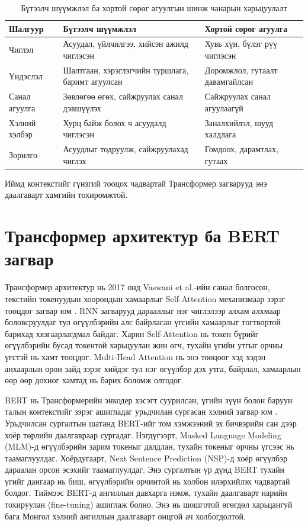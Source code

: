 \begin{table}[ht]
  \centering
  \small
  \caption{Бүтээлч шүүмжлэл ба хортой сөрөг агуулгын шинж чанарын харьцуулалт}
  \label{tab:constructive-vs-toxic}
  \begin{tabular}{@{}lp{4.6cm}p{4.6cm}@{}}
    \toprule
    \textbf{Шалгуур} & \textbf{Бүтээлч шүүмжлэл} & \textbf{Хортой сөрөг агуулга} \\
    \midrule
    Чиглэл        & Асуудал, үйлчилгээ, хийсэн ажилд чиглэсэн & Хувь хүн, бүлэг рүү чиглэсэн \\[2pt]
    Үндэслэл      & Шалтгаан, хэрэглэгчийн туршлага, баримт агуулсан      & Доромжлол, гутаалт давамгайлсан \\[2pt]
    Санал агуулга & Зөвлөгөө өгөх, сайжруулах санал дэвшүүлэх             & Сайжруулах санал агуулаагүй \\[2pt]
    Хэлний хэлбэр & Хурц байж болох ч асуудалд чиглэсэн                   & Заналхийлэл, шууд халдлага \\[2pt]
    Зорилго       & Асуудлыг тодруулж, сайжруулахад чиглэх                & Гомдоох, дарамтлах, гутаах \\
    \bottomrule
  \end{tabular}
\end{table}

Иймд контекстийг гүнзгий тооцох чадвартай Трансформер загварууд энэ
даалгаварт хамгийн тохиромжтой.

\section{Трансформер архитектур ба BERT загвар}
\label{sec:transformer}

Трансформер архитектур нь 2017 онд Vaswani et al.-ийн санал болгосон, текстийн
токенуудын хоорондын хамаарлыг Self-Attention механизмаар зэрэг тооцдог загвар
юм \cite{vaswani2017}. RNN загварууд дарааллыг нэг чиглэлээр алхам алхмаар
боловсруулдаг тул өгүүлбэрийн алс байрласан үгсийн хамаарлыг тогтвортой
барихад хязгаарлагдмал байдаг. Харин Self-Attention нь токен бүрийг өгүүлбэрийн
бусад токентой харьцуулан жин өгч, тухайн үгийн утгыг орчны үгстэй нь хамт
тооцдог. Multi-Head Attention нь энэ тооцоог хэд хэдэн анхаарлын орон зайд зэрэг
хийдэг тул нэг өгүүлбэр дэх утга, байрлал, хамаарлын өөр өөр дохиог хамтад нь
барих боломж олгодог.

BERT нь Трансформерийн энкодер хэсэгт суурилсан, үгийн зүүн болон баруун талын
контекстийг зэрэг ашигладаг урьдчилан сургасан хэлний загвар юм
\cite{devlin2019}. Урьдчилсан сургалтын шатанд BERT-ийг том хэмжээний эх бичвэрийн сан
дээр хоёр төрлийн даалгавраар сургадаг. Нэгдүгээрт, Masked Language Modeling
(MLM)-д өгүүлбэрийн зарим токеныг далдлан, тухайн токеныг орчны үгсээс нь
таамаглуулдаг. Хоёрдугаарт, Next Sentence Prediction (NSP)-д хоёр өгүүлбэр
дараалан орсон эсэхийг таамаглуулдаг. Энэ сургалтын үр дүнд BERT тухайн үгийг
дангаар нь биш, өгүүлбэрийн орчинтой нь холбон илэрхийлэх чадвартай болдог.
Тиймээс BERT-д ангиллын давхарга нэмж, тухайн даалгаварт нарийн тохируулан
(fine-tuning) ашиглаж болно. Энэ нь шошготой өгөгдөл харьцангуй бага Монгол
хэлний ангиллын даалгаварт онцгой ач холбогдолтой.

